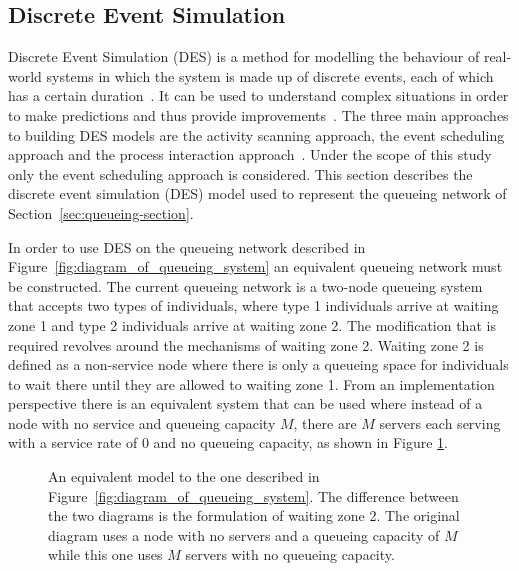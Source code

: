 \subsection{Discrete Event Simulation}

Discrete Event Simulation (DES) is a method for modelling the behaviour of
real-world systems in which the system is made up of discrete events, each of
which has a certain duration~\cite{DESstewart}.
It can be used to understand complex situations in order to make predictions
and thus provide improvements~\cite{VinceGeraintBook}.
The three main approaches to building DES models are the activity scanning
approach, the event scheduling approach and the process interaction
approach~\cite{DESapproaches}.
Under the scope of this study only the event scheduling approach is considered.
This section describes the discrete event simulation (DES) model used to
represent the queueing network of Section~\ref{sec:queueing-section}.

In order to use DES on the queueing network described in
Figure~\ref{fig:diagram_of_queueing_system} an equivalent queueing network must
be constructed.
The current queueing network is a two-node queueing system that accepts two
types of individuals, where type 1 individuals arrive at waiting zone 1 and
type 2 individuals arrive at waiting zone 2.
The modification that is required revolves around the mechanisms of waiting
zone 2.
Waiting zone 2 is defined as a non-service node where there is only a queueing
space for individuals to wait there until they are allowed to waiting zone 1.
From an implementation perspective there is an equivalent system that can be
used where instead of a node with no service and queueing capacity \(M\), there
are \(M\) servers each serving with a service rate of \(0\) and no queueing
capacity, as shown in Figure \ref{fig:equivalent_diagram_of_queueing_system}.

\begin{figure}[h]
    \centering
    
    \caption{An equivalent model to the one described in
    Figure~\ref{fig:diagram_of_queueing_system}. The difference between the two
    diagrams is the formulation of waiting zone 2. The original diagram uses
    a node with no servers and a queueing capacity of \(M\) while this one uses
    \(M\) servers with no queueing capacity.}
    \label{fig:equivalent_diagram_of_queueing_system}
\end{figure}
    

